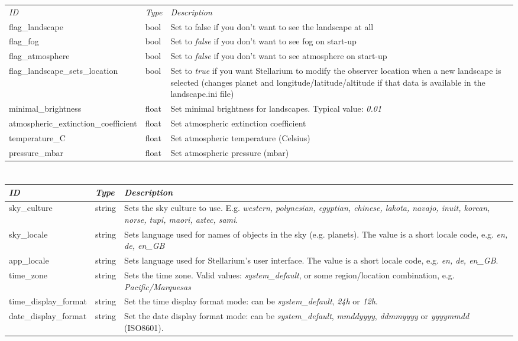 \begin{longtabu} to \textwidth {l|l|X}
\toprule
\emph{ID} & \emph{Type} & \emph{Description}\\
flag\_landscape & bool & Set to false if you don't want to
see the landscape at all\\
\midrule
flag\_fog & bool & Set to \emph{false} if you don't want to
see fog on start-up\\
\midrule
flag\_atmosphere & bool & Set to \emph{false} if you don't
want to see atmosphere on start-up\\
\midrule
flag\_landscape\_sets\_location & bool & Set to \emph{true}
if you want Stellarium to modify the observer location when a new
landscape is selected (changes planet and longitude/latitude/altitude if
that data is available in the landscape.ini file)\\
\midrule
minimal\_brightness & float & Set minimal brightness for
landscapes. Typical value: \emph{0.01}\\
\midrule
atmospheric\_extinction\_coefficient & float & Set atmospheric
extinction coefficient\\
\midrule
temperature\_C & float & Set atmospheric temperature
(Celsius)\\
\midrule
pressure\_mbar & float & Set atmospheric pressure
(mbar)\\
\bottomrule
\end{longtabu}

\section{}\label{section-localization}

\begin{longtabu} to \textwidth {l|l|X}
\toprule
\emph{ID} & \emph{Type} & \emph{Description}\\
\midrule
sky\_culture & string & Sets the sky culture to use. E.g.
\emph{western, polynesian, egyptian, chinese, lakota, navajo, inuit,
korean, norse, tupi, maori, aztec, sami}.\\
\midrule
sky\_locale & string & Sets language used for names of
objects in the sky (e.g. planets). The value is a short locale code,
e.g. \emph{en, de, en\_GB}\\
\midrule
app\_locale & string & Sets language used for Stellarium's
user interface. The value is a short locale code, e.g. \emph{en, de,
en\_GB}.\\
\midrule
time\_zone & string & Sets the time zone. Valid values:
\emph{system\_default}, or some region/location combination, e.g.
\emph{Pacific/Marquesas}\\
\midrule
time\_display\_format & string & Set the time display format
mode: can be \emph{system\_default}, \emph{24h} or
\emph{12h}.\\
\midrule
date\_display\_format & string & Set the date display format
mode: can be \emph{system\_default}, \emph{mmddyyyy}, \emph{ddmmyyyy} or
\emph{yyyymmdd} (ISO8601).\\
\bottomrule
\end{longtabu}

